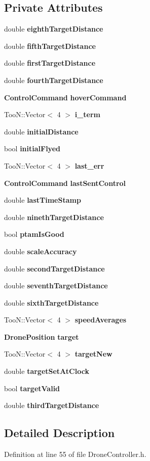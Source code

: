 \subsection*{Private Attributes}
\begin{DoxyCompactItemize}
\item 
double {\bf eighth\-Target\-Distance}
\item 
double {\bf fifth\-Target\-Distance}
\item 
double {\bf first\-Target\-Distance}
\item 
double {\bf fourth\-Target\-Distance}
\item 
{\bf Control\-Command} {\bf hover\-Command}
\item 
Too\-N\-::\-Vector$<$ 4 $>$ {\bf i\-\_\-term}
\item 
double {\bf initial\-Distance}
\item 
bool {\bf initial\-Flyed}
\item 
Too\-N\-::\-Vector$<$ 4 $>$ {\bf last\-\_\-err}
\item 
{\bf Control\-Command} {\bf last\-Sent\-Control}
\item 
double {\bf last\-Time\-Stamp}
\item 
double {\bf nineth\-Target\-Distance}
\item 
bool {\bf ptam\-Is\-Good}
\item 
double {\bf scale\-Accuracy}
\item 
double {\bf second\-Target\-Distance}
\item 
double {\bf seventh\-Target\-Distance}
\item 
double {\bf sixth\-Target\-Distance}
\item 
Too\-N\-::\-Vector$<$ 4 $>$ {\bf speed\-Averages}
\item 
{\bf Drone\-Position} {\bf target}
\item 
Too\-N\-::\-Vector$<$ 4 $>$ {\bf target\-New}
\item 
double {\bf target\-Set\-At\-Clock}
\item 
bool {\bf target\-Valid}
\item 
double {\bf third\-Target\-Distance}
\end{DoxyCompactItemize}


\subsection{Detailed Description}


Definition at line 55 of file Drone\-Controller.\-h.



